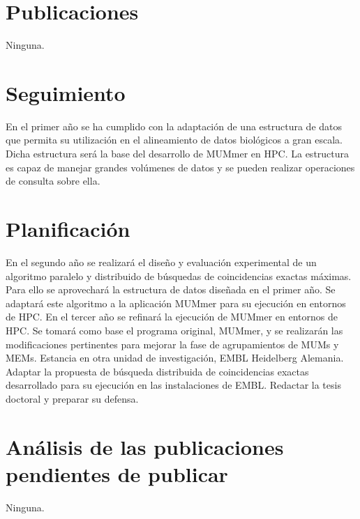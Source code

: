 \documentclass[12pt,a4paper]{article}
\begin{document}
\section{Publicaciones}
\noindent
Ninguna.
\section{Seguimiento}
En el primer año se ha cumplido con la adaptación de una estructura de datos que permita su utilización
en el alineamiento de datos biológicos a gran escala. Dicha estructura será la base del desarrollo de MUMmer en HPC.
La estructura es capaz de manejar grandes volúmenes de datos y se pueden realizar operaciones de consulta sobre ella.
\section{Planificación}
En el segundo año se realizará el diseño y evaluación experimental de un algoritmo paralelo y distribuido de búsquedas de 
coincidencias exactas máximas. Para ello se aprovechará la estructura de datos diseñada en el primer año. Se adaptará este
algoritmo a la aplicación MUMmer para su ejecución en entornos de HPC.
En el tercer año se refinará la ejecución de MUMmer en entornos de HPC. Se tomará como base el programa original, MUMmer, y 
se realizarán las modificaciones pertinentes para mejorar la fase de agrupamientos de MUMs y MEMs. Estancia en otra unidad 
de investigación, EMBL Heidelberg Alemania. Adaptar la propuesta de búsqueda distribuida de coincidencias exactas desarrollado para su
ejecución en las instalaciones de EMBL. Redactar la tesis doctoral y preparar su defensa.
\section{Análisis de las publicaciones pendientes de publicar}
\noindent
Ninguna.
\end{document}

